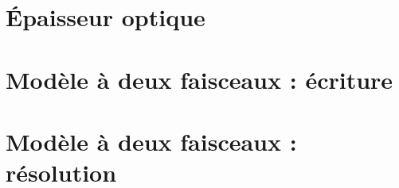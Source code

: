 \documentclass[a4paper,DIV16,10pt]{scrartcl}
\begin{document}
\newpage
\section{\'Epaisseur optique}


\newpage
\section{Modèle à deux faisceaux : écriture}


\newpage
\section{Modèle à deux faisceaux : résolution}


%
\end{document}
